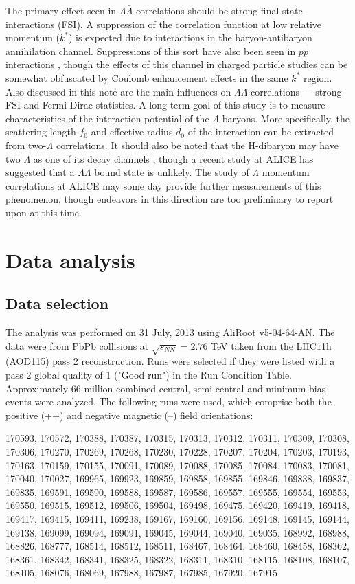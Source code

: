 The primary effect seen in $\Lambda\bar{\Lambda}$ correlations should be strong final state interactions (FSI).  A suppression of the correlation function at low relative momentum ($k^*$) is expected due to interactions in the baryon-antibaryon annihilation channel.  Suppressions of this sort have also been seen in $p \bar{p}$ interactions \cite{Gos:2007cj}, though the effects of this channel in charged particle studies can be somewhat obfuscated by Coulomb enhancement effects in the same $k^*$ region.  Also discussed in this note are the main influences on $\Lambda\Lambda$ correlations --- strong FSI and Fermi-Dirac statistics.  A long-term goal of this study is to measure characteristics of the interaction potential of the $\Lambda$ baryons.  More specifically, the scattering length $f_0$ and effective radius $d_0$ of the interaction can be extracted from two-$\Lambda$ correlations. It should also be noted that the H-dibaryon may have two $\Lambda$ as one of its decay channels \cite{PhysRevLett.38.195}, though a recent study at ALICE has suggested that a $\Lambda\Lambda$ bound state is unlikely.  The study of $\Lambda$ momentum correlations at ALICE may some day provide further measurements of this phenomenon, though endeavors in this direction are too preliminary to report upon at this time.

\section{Data analysis}
\subsection{Data selection}
\label{sec:DataSelection}
The analysis was performed on 31 July, 2013 using AliRoot v5-04-64-AN. The data were from PbPb collisions at $\sqrt{s_{NN}}=2.76$  TeV taken from the LHC11h (AOD115) pass 2 reconstruction. Runs were selected if they were listed with a pass 2 global quality of 1 ("Good run") in the Run Condition Table. Approximately 66 million combined central, semi-central and minimum bias events were analyzed. The following runs were used, which comprise both the positive (++) and negative magnetic (--) field orientations:

170593, 170572, 170388, 170387, 170315, 170313, 170312, 170311, 170309, 170308, 170306, 170270, 170269, 170268, 170230, 170228, 170207, 170204, 170203, 170193, 170163, 170159, 170155, 170091, 170089, 170088, 170085, 170084, 170083, 170081, 170040, 170027, 169965, 169923, 169859, 169858, 169855, 169846, 169838, 169837, 169835, 169591, 169590, 169588, 169587, 169586, 169557, 169555, 169554, 169553, 169550, 169515, 169512, 169506, 169504, 169498, 169475, 169420, 169419, 169418, 169417, 169415, 169411, 169238, 169167, 169160, 169156, 169148, 169145, 169144, 169138, 169099, 169094, 169091, 169045, 169044, 169040, 169035, 168992, 168988, 168826, 168777, 168514, 168512, 168511, 168467, 168464, 168460, 168458, 168362, 168361, 168342, 168341, 168325, 168322, 168311, 168310, 168115, 168108, 168107, 168105, 168076, 168069, 167988, 167987, 167985, 167920, 167915

